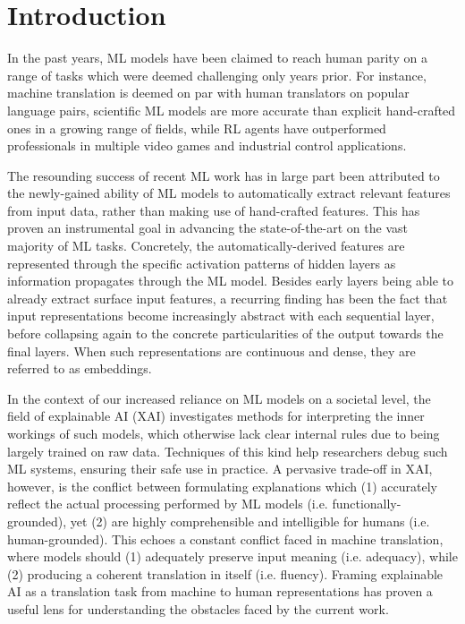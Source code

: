 \section{Introduction}\label{sec:introduction}

In the past years, ML models have been claimed to reach human parity on a range of tasks which were deemed challenging only years prior. For instance, machine translation is deemed on par with human translators on popular language pairs, scientific ML models are more accurate than explicit hand-crafted ones in a growing range of fields, while RL agents have outperformed professionals in multiple video games and industrial control applications.

The resounding success of recent ML work has in large part been attributed to the newly-gained ability of ML models to automatically extract relevant features from input data, rather than making use of hand-crafted features. This has proven an instrumental goal in advancing the state-of-the-art on the vast majority of ML tasks. Concretely, the automatically-derived features are represented through the specific activation patterns of hidden layers as information propagates through the ML model. Besides early layers being able to already extract surface input features, a recurring finding has been the fact that input representations become increasingly abstract with each sequential layer, before collapsing again to the concrete particularities of the output towards the final layers. When such representations are continuous and dense, they are referred to as embeddings.

In the context of our increased reliance on ML models on a societal level, the field of explainable AI (XAI) investigates methods for interpreting the inner workings of such models, which otherwise lack clear internal rules due to being largely trained on raw data. Techniques of this kind help researchers debug such ML systems, ensuring their safe use in practice. A pervasive trade-off in XAI, however, is the conflict between formulating explanations which (1) accurately reflect the actual processing performed by ML models (i.e. functionally-grounded), yet (2) are highly comprehensible and intelligible for humans (i.e. human-grounded). This echoes a constant conflict faced in machine translation, where models should (1) adequately preserve input meaning (i.e. adequacy), while (2) producing a coherent translation in itself (i.e. fluency). Framing explainable AI as a translation task from machine to human representations has proven a useful lens for understanding the obstacles faced by the current work.


